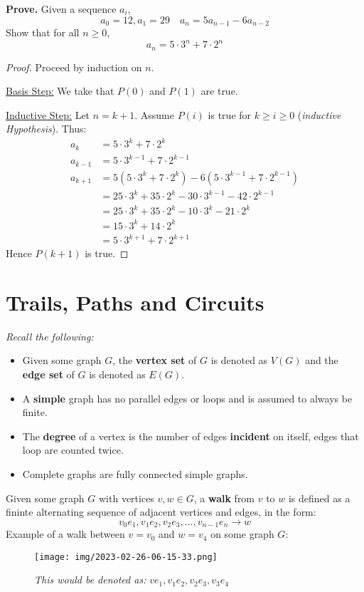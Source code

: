 \documentclass[a4paper]{article}
\begin{document}
  \textbf{Prove.} Given a sequence $a_i$, 
  \[
    a_0 = 12, a_1 = 29 \quad a_n = 5a_{n-1} - 6a_{n-2}
  \]
  Show that for all $n \geq 0$,
  \[
    a_n = 5 \cdot 3^n + 7 \cdot 2^n
  \]
  \begin{proof}
    Proceed by induction on $n$.

    \underline{Basis Step:} We take that $P(0)$ and $P(1)$ are true.
    
    \underline{Inductive Step:} Let $n=k+1$. Assume $P(i)$ is true for $k \geq i \geq 0$ (\textit{inductive Hypothesis}). Thus:
    \begin{displaymath}
      \begin{split}
        a_k &= 5 \cdot 3^k + 7 \cdot 2^k \\
        a_{k-1} &= 5 \cdot 3^{k-1} + 7 \cdot 2^{k-1} \\
        a_{k+1} &= 5(5\cdot 3^k + 7\cdot 2^k) - 6(5\cdot 3^{k-1} + 7\cdot 2^{k-1})\\
                &= 25 \cdot 3^k + 35 \cdot 2^k - 30 \cdot 3^{k-1} - 42 \cdot 2^{k-1} \\ 
                &= 25 \cdot 3^k + 35 \cdot 2^k - 10 \cdot 3^k - 21 \cdot 2^k \\ 
                &= 15 \cdot 3^k + 14 \cdot 2^k \\
                &= 5 \cdot 3^{k+1} + 7 \cdot 2^{k+1}
      \end{split}
    \end{displaymath}
    Hence $P(k+1)$ is true.
  \end{proof}
  
  \newpage
  \section{Trails, Paths and Circuits} 
  \textit{Recall the following: }
  \begin{itemize}
    \item Given some graph $G$, the \textbf{vertex set} of $G$ is denoted as $V(G)$ and the \textbf{edge set} of $G$ is denoted as $E(G)$.
    \item A \textbf{simple} graph has no parallel edges or loops and is assumed to always be finite.
    \item The \textbf{degree} of a vertex is the number of edges \textbf{incident} on itself, edges that loop are counted twice.
    \item Complete graphs are fully connected simple graphs.
  \end{itemize}
  Given some graph $G$ with vertices $v,w \in G$, a \textbf{walk} from $v$ to $w$ is defined as a fininte alternating sequence of adjacent vertices and edges, in the form:
  \[
    v_0e_1,v_1e_2,v_2e_3,\dots,v_{n-1}e_n \rightarrow w
  \]
  Example of a walk between $v = v_0$ and $w=v_4$ on some graph $G$:
  \begin{figure}[h]
    \begin{center}
      \texttt{[image: img/2023-02-26-06-15-33.png]}
      \caption*{\textit{This would be denoted as:} $ve_1, v_1e_2, v_2e_3, v_3e_4$}
      \label{fig:walk}
    \end{center}
  \end{figure}
\end{document}
